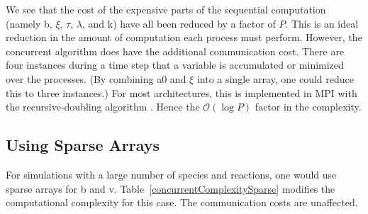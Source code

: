 \documentclass[letterpaper]{article}
\begin{document}
We see that the cost of the expensive parts of the sequential computation 
(namely b, $\xi$, $\tau$, $\lambda$, and k) have all been reduced by a factor 
of $P$.  This is an ideal reduction in the amount of computation each process 
must perform.  However, the concurrent algorithm does have the additional
communication cost.  There are four instances during a time step that 
a variable is accumulated or minimized over the processes.  (By combining
a0 and $\xi$ into a single array, one could reduce this to three instances.)
For most architectures, this is implemented in MPI with the 
recursive-doubling algorithm
\cite{vandevelde}.  Hence the $\mathcal{O}(\log P)$ factor in the complexity.


\subsection{Using Sparse Arrays}


For simulations with a large number of species and reactions, one would
use sparse arrays for b and v.
Table~\ref{concurrentComplexitySparse} modifies the computational 
complexity for this case.  The communication costs are unaffected.
\end{document}
